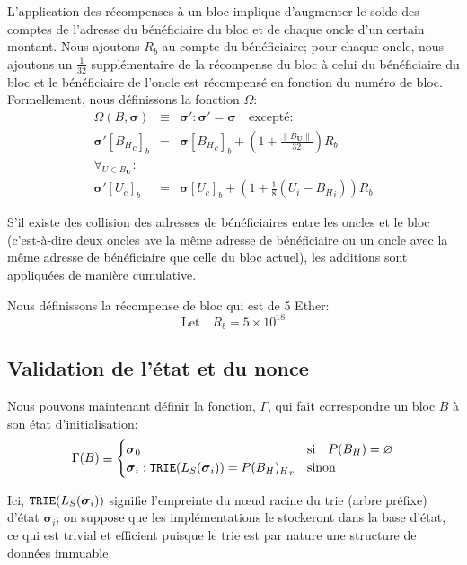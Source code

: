 \documentclass[9pt,oneside]{amsart}
\begin{document}
\begin{multicols}{2}
L'application des récompenses à un bloc implique d'augmenter le solde des comptes de l'adresse du bénéficiaire du bloc et de chaque oncle d'un certain montant. Nous ajoutons $R_b$ au compte du bénéficiaire; pour chaque oncle, nous ajoutons un $\frac{1}{32}$ supplémentaire de la récompense du bloc à celui du bénéficiaire du bloc et le bénéficiaire de l'oncle est récompensé en fonction du numéro de bloc. Formellement, nous définissons la fonction $\Omega$:
\begin{eqnarray}
\Omega(B, \boldsymbol{\sigma}) & \equiv & \boldsymbol{\sigma}': \boldsymbol{\sigma}' = \boldsymbol{\sigma} \quad \text{excepté:} \\
\boldsymbol{\sigma}'[{B_H}_c]_b & = & \boldsymbol{\sigma}[{B_H}_c]_b + (1 + \frac{\lVert B_\mathbf{U}\rVert}{32})R_b \\
\forall_{U \in B_\mathbf{U}}: \\ \nonumber
 \boldsymbol{\sigma}'[U_c]_b & = & \boldsymbol{\sigma}[U_c]_b + (1 + \frac{1}{8} (U_i - {B_H}_i)) R_b
\end{eqnarray}

S'il existe des collision des adresses de bénéficiaires entre les oncles et le bloc (c'est-à-dire deux oncles ave la même adresse de bénéficiaire ou un oncle avec la même adresse de bénéficiaire que celle du bloc actuel), les additions sont appliquées de manière cumulative.

Nous définissons la récompense de bloc qui est de 5 Ether:
\begin{equation}
\text{Let} \quad R_b = 5 \times 10^{18}
\end{equation}

\subsection{Validation de l'état et du nonce}\label{sec:statenoncevalidation}

Nous pouvons maintenant définir la fonction, $\Gamma$, qui fait correspondre un bloc $B$ à son état d'initialisation:
\begin{equation}
\Gamma(B) \equiv \begin{cases}
\boldsymbol{\sigma}_0 & \text{si} \quad P(B_H) = \varnothing \\
\boldsymbol{\sigma}_i: \mathtt{\small TRIE}(L_S(\boldsymbol{\sigma}_i)) = {P(B_H)_H}_r & \text{sinon}
\end{cases}
\end{equation}

Ici, $\mathtt{\small TRIE}(L_S(\boldsymbol{\sigma}_i))$ signifie l'empreinte du n\oe{}ud racine du trie (arbre préfixe) d'état $\boldsymbol{\sigma}_i$; on suppose que les implémentations le stockeront dans la base d'état, ce qui est trivial et efficient puisque le trie est par nature une structure de données immuable.


\end{multicols}
\end{document}
